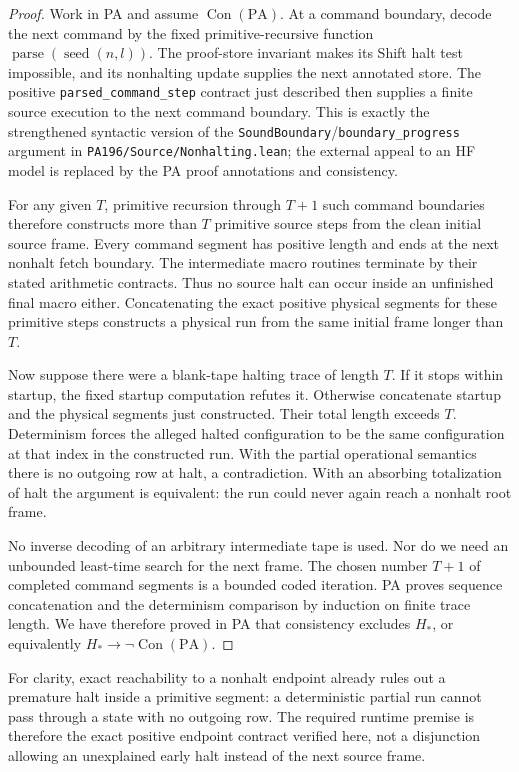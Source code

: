 \begin{proof}
Work in PA and assume $\operatorname{Con}(\mathrm{PA})$.
At a command boundary, decode the next command by the fixed
primitive-recursive function
$\operatorname{parse}(\operatorname{seed}(n,l))$.
The proof-store invariant makes its Shift halt test impossible,
and its nonhalting update supplies the next annotated store.
The positive \texttt{parsed\_command\_step} contract just described
then supplies a finite source execution to the next command
boundary. This is exactly the strengthened syntactic version of
the \texttt{SoundBoundary}/\texttt{boundary\_progress} argument in
\texttt{PA196/Source/Nonhalting.lean}; the external appeal to an
HF model is replaced by the PA proof annotations and consistency.

For any given $T$, primitive recursion through $T+1$ such command
boundaries therefore constructs more than $T$ primitive source
steps from the clean initial source frame. Every command segment
has positive length and ends at the next nonhalt fetch boundary.
The intermediate macro routines terminate by their stated
arithmetic contracts. Thus no source halt can occur inside an
unfinished final macro either. Concatenating the exact positive
physical segments for these primitive steps constructs a physical
run from the same initial frame longer than $T$.

Now suppose there were a blank-tape halting trace of length $T$.
If it stops within startup, the fixed startup computation refutes
it. Otherwise concatenate startup and the physical segments just
constructed. Their total length exceeds $T$. Determinism forces
the alleged halted configuration to be the same configuration
at that index in the constructed run. With the partial operational
semantics there is no outgoing row at halt, a contradiction.
With an absorbing totalization of halt the argument is equivalent:
the run could never again reach a nonhalt root frame.

No inverse decoding of an arbitrary intermediate tape is used.
Nor do we need an unbounded least-time search for the next frame.
The chosen number $T+1$ of completed command segments is a
bounded coded iteration. PA proves sequence concatenation and the
determinism comparison by induction on finite trace length.
We have therefore proved in PA that consistency excludes $H_*$,
or equivalently $H_*\to\neg\operatorname{Con}(\mathrm{PA})$.
\end{proof}

For clarity, exact reachability to a nonhalt endpoint already rules
out a premature halt inside a primitive segment: a deterministic
partial run cannot pass through a state with no outgoing row.
The required runtime premise is therefore the exact positive
endpoint contract verified here, not a disjunction allowing an
unexplained early halt instead of the next source frame.

